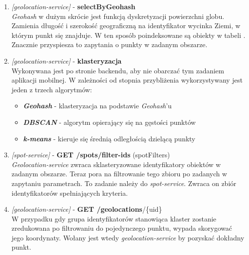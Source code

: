 \begin{enumerate}
    \item
    \large\emph{[geolocation-service]} - \textbf{selectByGeohash}\normalsize\\
    \emph{Geohash} w dużym skrócie jest funkcją dyskretyzacji powierzchni globu.
    Zamienia długość i szerokość geograficzną na identyfikator wycinka Ziemi, w którym punkt się znajduje.
    W ten sposób poindeksowane są obiekty w tabeli . Znacznie przyspiesza to zapytania o punkty w zadanym obszarze.

    \item
    \large\emph{[geolocation-service]} - \textbf{klasteryzacja}\normalsize\\
    Wykonywana jest po stronie backendu, aby nie obarczać tym zadaniem aplikacji mobilnej. 
    W zależności od stopnia przybliżenia wykorzystywany jest jeden z trzech algorytmów:

    \begin{itemize}
        \item
        \textbf{\emph{Geohash}} - klasteryzacja na podstawie \emph{Geohash}'u

        \item
        \textbf{\emph{DBSCAN}} - algorytm opierający się na gęstości punktów

        \item
        \textbf{\emph{k-means}} - kieruje się średnią odległością dzielącą punkty

    \end{itemize} 

    \bigskip\bigskip\bigskip

    \item
    \large{\emph{[spot-service]} - \textbf{GET /spots/filter-ids} (spotFilters)}\normalsize\\
    \emph{Geolocation-service} zwraca sklasteryzowane identyfikatory obiektów w zadanym obszarze.
    Teraz pora na filtrowanie tego zbioru po zadanych w zapytaniu parametrach.
    To zadanie należy do \emph{spot-service}. Zwraca on zbiór identyfikatorów spełniających kryteria.

    \bigskip\bigskip\bigskip

    \item
    \large{\emph{[geolocation-service]} - \textbf{GET /geolocations}/\{uid\}}\normalsize\\
    W przypadku gdy grupa identyfikatorów stanowiąca klaster zostanie zredukowana po filtrowaniu do pojedynczego punktu, wypada skorygować jego koordynaty.
    Wołany jest wtedy \emph{geolocation-service} by pozyskać dokładny punkt.


\end{enumerate}
